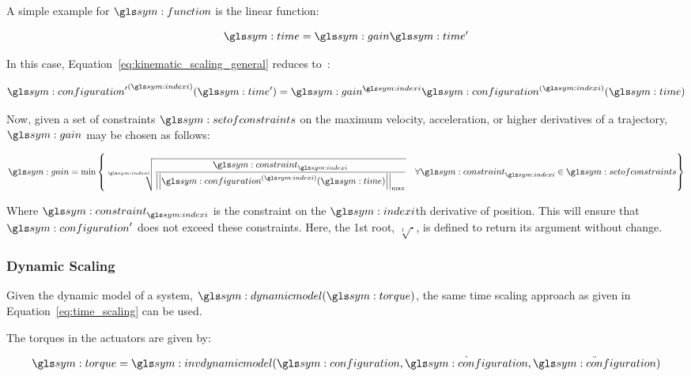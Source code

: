 			A simple example for $\function$ is the linear function:

			\begin{equation}
				\timesym = \gain\timesym'
				\label{eq:linear_time_scaling}
			\end{equation}

			In this case, Equation~\ref{eq:kinematic_scaling_general} reduces
			to~\cite{bib:traj:trajectory_planning_for_automatic_machines_and_robots}:

			\begin{equation}
				\tdern{\configuration'}{\indexi}(\timesym') = \gain^{\indexi}
					\tdern{\configuration}{\indexi}(\timesym)
			\end{equation}

			Now, given a set of constraints $\setofconstraints$ on the maximum
			velocity, acceleration, or higher derivatives of a trajectory,
			$\gain$ may be chosen as follows:

			\begin{equation}
				\gain = \min
					\left\{
						\sqrt[\indexi]
						{%
							\frac
							{%
								\constraint_{\indexi}
							}
							{%
									\norm
									{%
										\tdern{\configuration}{\indexi}(\timesym)
									}_{\max}
							}
						}
						\quad
						\forall \constraint_{\indexi} \in \setofconstraints
					\right\}
			\end{equation}

			Where $\constraint_{\indexi}$ is the constraint on the $\indexi$th
			derivative of position. This will ensure that $\configuration'$ does
			not exceed these constraints. Here, the 1st root, $\sqrt[1]{\cdot}$,
			is defined to return its argument without change.

		\subsubsection{Dynamic Scaling}%
		\label{sec:dynamic_scaling}

			Given the dynamic model of a system, $\dynamicmodel(\torque)$, the
			same time scaling approach as given in
			Equation~\ref{eq:time_scaling} can be used.

			The torques in the actuators are given by:

			\begin{equation}
				\torque = \invdynamicmodel(\configuration, \dot{\configuration},
					\ddot{\configuration})
				\label{eq:inv_dynamic_model_scaling}
			\end{equation}

